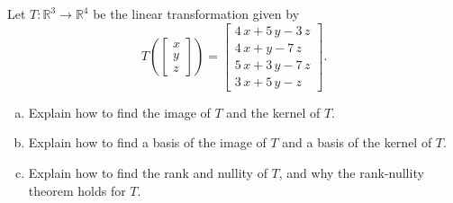 
\begin{exerciseStatement}
 Let \(T:\mathbb{R}^ 3  \to \mathbb{R}^ 4 \) be the linear transformation given by \[T\left(  \left[\begin{array}{c}
x \\
y \\
z
\end{array}\right]  \right) =  \left[\begin{array}{c}
4 \, x + 5 \, y - 3 \, z \\
4 \, x + y - 7 \, z \\
5 \, x + 3 \, y - 7 \, z \\
3 \, x + 5 \, y - z
\end{array}\right] .\]
\begin{enumerate}[(a)]
\item Explain how to find the image of \(T\) and the kernel of \(T\).
\item Explain how to find a basis of the image of \(T\) and a basis of the kernel of \(T\).
\item Explain how to find the rank and nullity of \(T\), and why the rank-nullity theorem holds for \(T\).
\end{enumerate}
    
\end{exerciseStatement}
    
